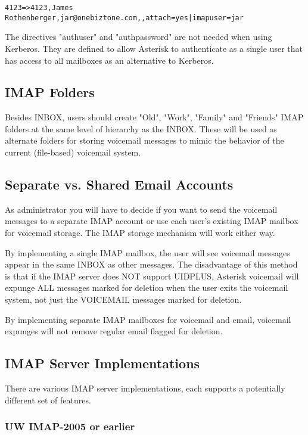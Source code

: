\begin{verbatim}
4123=>4123,James Rothenberger,jar@onebiztone.com,,attach=yes|imapuser=jar
\end{verbatim}

The directives "authuser" and "authpassword" are not needed when using
Kerberos. They are defined to allow Asterisk to authenticate as a single 
user that has access to all mailboxes as an alternative to Kerberos.


\subsection{IMAP Folders}

Besides INBOX, users should create "Old", "Work", "Family" and "Friends" 
IMAP folders at the same level of hierarchy as the INBOX.  These will be 
used as alternate folders for storing voicemail messages to mimic the 
behavior of the current (file-based) voicemail system.


\subsection{Separate vs. Shared Email Accounts}

As administrator you will have to decide if you want to send the voicemail
messages to a separate IMAP account or use each user's existing IMAP mailbox
for voicemail storage.  The IMAP storage mechanism will work either way. 

By implementing a single IMAP mailbox, the user will see voicemail messages
appear in the same INBOX as other messages.  The disadvantage of this method
is that if the IMAP server does NOT support UIDPLUS, Asterisk voicemail will
expunge ALL messages marked for deletion when the user exits the voicemail 
system, not just the VOICEMAIL messages marked for deletion.

By implementing separate IMAP mailboxes for voicemail and email, voicemail 
expunges will not remove regular email flagged for deletion.


\subsection{IMAP Server Implementations}

There are various IMAP server implementations, each supports a potentially
different set of features.  


\subsubsection{UW IMAP-2005 or earlier}

